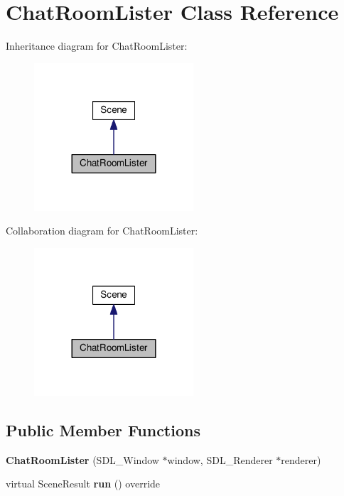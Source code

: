\hypertarget{classChatRoomLister}{}\section{Chat\+Room\+Lister Class Reference}
\label{classChatRoomLister}


Inheritance diagram for Chat\+Room\+Lister\+:\nopagebreak
\begin{figure}[H]
\begin{center}
\leavevmode
\includegraphics[width=168pt]{classChatRoomLister__inherit__graph}
\end{center}
\end{figure}


Collaboration diagram for Chat\+Room\+Lister\+:\nopagebreak
\begin{figure}[H]
\begin{center}
\leavevmode
\includegraphics[width=168pt]{classChatRoomLister__coll__graph}
\end{center}
\end{figure}
\subsection*{Public Member Functions}
\begin{DoxyCompactItemize}
\item 
{\bfseries Chat\+Room\+Lister} (S\+D\+L\+\_\+\+Window $\ast$window, S\+D\+L\+\_\+\+Renderer $\ast$renderer)\hypertarget{classChatRoomLister_a1361cdff946e7944ca05bcf05a5cb5c1}{}\label{classChatRoomLister_a1361cdff946e7944ca05bcf05a5cb5c1}

\item 
virtual Scene\+Result {\bfseries run} () override\hypertarget{classChatRoomLister_a9ffee813f6d8c1b9b664771e02f59148}{}\label{classChatRoomLister_a9ffee813f6d8c1b9b664771e02f59148}

\end{DoxyCompactItemize}
